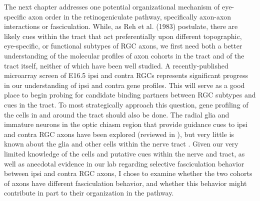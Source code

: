 The next chapter addresses one potential organizational mechanism of eye-specific axon order in the retinogeniculate pathway, specifically axon-axon interactions or fasciculation.
While, as Reh et al. (1983) postulate, there are likely cues within the tract that act preferentially upon different topographic, eye-specific, or functional subtypes of RGC axons, we first need both a better understanding of the molecular profiles of axon cohorts in the tract and of the tract itself, neither of which have been well studied.
A recently-published microarray screen of E16.5 ipsi and contra RGCs represents significant progress in our understanding of ipsi and contra gene profiles.  %
This will serve as a good place to begin probing for candidate binding partners between RGC subtypes and cues in the tract.
To most strategically approach this question, gene profiling of the cells in and around the tract should also be done.
The radial glia and immature neurons in the optic chiasm region that provide guidance cues to ipsi and contra RGC axons have been explored (reviewed in \cite{erskine2014connecting,herrera2008genetics,petros2008retinal}), but very little is known about the glia and other cells within the nerve tract \cite{colello1992observations,guillery1987changing}.
Given our very limited knowledge of the cells and putative cues within the nerve and tract, as well as anecdotal evidence in our lab regarding selective fasciculation behavior between ipsi and contra RGC axons, I chose to examine whether the two cohorts of axons have different fasciculation behavior, and whether this behavior might contribute in part to their organization in the pathway.